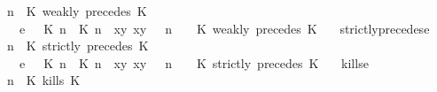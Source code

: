 \begin{isabellebody}
\ \ {\isachardoublequoteopen}{\isacharparenleft}{\isasymGamma}{\isacharcomma}\ n\ {\isasymturnstile}\ {\isacharparenleft}{\isacharparenleft}K\ weakly\ precedes\ K\ {\isacharhash}\ {\isasymPsi}{\isacharparenright}\ {\isasymtriangleright}\ {\isasymPhi}{\isacharparenright}\isanewline
\ \ \ \ \ {\isasymhookrightarrow}\isactrlsub e\ \ {\isacharparenleft}{\isacharparenleft}{\isacharparenleft}{\isasymlceil}{\isacharhash}\isactrlsup {\isasymle}\ K\ n{\isacharcomma}\ {\isacharhash}\isactrlsup {\isasymle}\ K\ n{\isasymrceil}\ {\isasymin}\ {\isacharparenleft}{\isasymlambda}{\isacharparenleft}x{\isacharcomma}y{\isacharparenright}{\isachardot}\ x{\isasymle}y{\isacharparenright}{\isacharparenright}\ {\isacharhash}\ {\isasymGamma}{\isacharparenright}{\isacharcomma}\ n\ {\isasymturnstile}\ {\isasymPsi}\ {\isasymtriangleright}\ {\isacharparenleft}{\isacharparenleft}K\ weakly\ precedes\ K\ {\isacharhash}\ {\isasymPhi}{\isacharparenright}{\isacharparenright}{\isachardoublequoteclose}\isanewline
{\isacharbar}\ strictly{\isacharunderscore}precedes{\isacharunderscore}e{\isacharcolon}\isanewline
\ \ {\isachardoublequoteopen}{\isacharparenleft}{\isasymGamma}{\isacharcomma}\ n\ {\isasymturnstile}\ {\isacharparenleft}{\isacharparenleft}K\ strictly\ precedes\ K\ {\isacharhash}\ {\isasymPsi}{\isacharparenright}\ {\isasymtriangleright}\ {\isasymPhi}{\isacharparenright}\isanewline
\ \ \ \ \ {\isasymhookrightarrow}\isactrlsub e\ \ {\isacharparenleft}{\isacharparenleft}{\isacharparenleft}{\isasymlceil}{\isacharhash}\isactrlsup {\isasymle}\ K\ n{\isacharcomma}\ {\isacharhash}\isactrlsup {\isacharless}\ K\ n{\isasymrceil}\ {\isasymin}\ {\isacharparenleft}{\isasymlambda}{\isacharparenleft}x{\isacharcomma}y{\isacharparenright}{\isachardot}\ x{\isasymle}y{\isacharparenright}{\isacharparenright}\ {\isacharhash}\ {\isasymGamma}{\isacharparenright}{\isacharcomma}\ n\ {\isasymturnstile}\ {\isasymPsi}\ {\isasymtriangleright}\ {\isacharparenleft}{\isacharparenleft}K\ strictly\ precedes\ K\ {\isacharhash}\ {\isasymPhi}{\isacharparenright}{\isacharparenright}{\isachardoublequoteclose}\isanewline
{\isacharbar}\ kills{\isacharunderscore}e{}{\isacharcolon}\isanewline
\ \ {\isachardoublequoteopen}{\isacharparenleft}{\isasymGamma}{\isacharcomma}\ n\ {\isasymturnstile}\ {\isacharparenleft}{\isacharparenleft}K\ kills\ K\ {\isacharhash}\ {\isasymPsi}{\isacharparenright}\ {\isasymtriangleright}\ {\isasymPhi}{\isacharparenright}\isanewline

\end{isabellebody}
